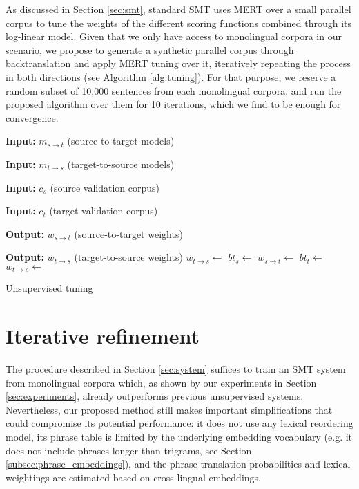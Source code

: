 \documentclass[11pt,a4paper]{article}
\begin{document}
As discussed in Section \ref{sec:smt}, standard SMT uses MERT over a small parallel corpus to tune the weights of the different scoring functions combined through its log-linear model. Given that we only have access to monolingual corpora in our scenario, we propose to generate a synthetic parallel corpus through backtranslation \citep{sennrich2016improving} and apply MERT tuning over it, iteratively repeating the process in both directions (see Algorithm \ref{alg:tuning}). For that purpose, we reserve a random subset of 10,000 sentences from each monolingual corpora, and run the proposed algorithm over them for 10 iterations, which we find to be enough for convergence.

\begin{algorithm}[t]
\begin{algorithmic}[1]
\item[\textbf{Input:} $m_{s \rightarrow t}$ (source-to-target models)]
\item[\textbf{Input:} $m_{t \rightarrow s}$ (target-to-source models)]
\item[\textbf{Input:} $c_{s}$ (source validation corpus)]
\item[\textbf{Input:} $c_{t}$ (target validation corpus)]
\item[\textbf{Output:} $w_{s \rightarrow t}$ (source-to-target weights)]
\item[\textbf{Output:} $w_{t \rightarrow s}$ (target-to-source weights)]
\State $w_{t \rightarrow s} \gets$ 
\Repeat
  \State $bt_s \gets$ 
  \State $w_{s \rightarrow t} \gets$ 
  \State $bt_t \gets$ 
  \State $w_{t \rightarrow s} \gets$ 
\end{algorithmic}
\caption{Unsupervised tuning}
\label{alg:tuning}
\end{algorithm}


\section{Iterative refinement} \label{sec:backtranslation}
The procedure described in Section \ref{sec:system} suffices to train an SMT system from monolingual corpora which, as shown by our experiments in Section \ref{sec:experiments}, already outperforms previous unsupervised systems. Nevertheless, our proposed method still makes important simplifications that could compromise its potential performance: it does not use any lexical reordering model, its phrase table is limited by the underlying embedding vocabulary (e.g. it does not include phrases longer than trigrams, see Section \ref{subsec:phrase_embeddings}), and the phrase translation probabilities and lexical weightings are estimated based on cross-lingual embeddings.
\end{document}
